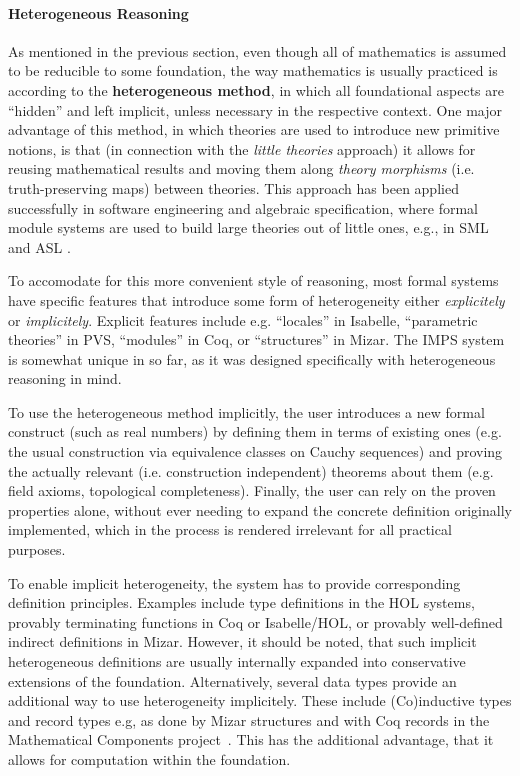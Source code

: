 \paragraph*{Heterogeneous Reasoning} As mentioned in the previous section, even though all of ma\-the\-ma\-tics is assumed to be reducible to some foundation, the way mathematics is usually practiced is according to the \textbf{heterogeneous method}, in which all foundational aspects are ``hidden'' and left implicit, unless necessary in the respective context. One major advantage of this method, in which theories are used to introduce new primitive notions, is that (in connection with the \emph{little theories} approach) it allows for reusing mathematical results and moving them along \emph{theory morphisms} (i.e. truth-preserving maps) between theories. This approach has been applied successfully in software engineering and algebraic specification, where formal module systems are used to build large theories out of little ones, e.g., in SML \cite{sml} and ASL \cite{asl}.

To accomodate for this more convenient style of reasoning, most formal systems have specific features that introduce some form of heterogeneity either \emph{explicitely} or \emph{implicitely}. Explicit features include e.g. ``locales'' in Isabelle,
``parametric theories'' in PVS, ``modules'' in Coq, or ``structures'' in Mizar. The 
IMPS system \cite{imps} is somewhat unique in so far, as it was designed specifically with heterogeneous reasoning in mind.

To use the heterogeneous method implicitly, the user introduces a new formal construct (such as real numbers) by defining them in terms of existing ones (e.g. the usual construction via equivalence classes on Cauchy sequences) and proving the actually relevant (i.e. construction independent) theorems about them (e.g. field axioms, topological completeness). Finally, the user can rely on the proven properties alone, without ever needing to expand the concrete definition originally implemented, which in the process is rendered irrelevant for all practical purposes.

To enable implicit heterogeneity, the system has to provide corresponding definition principles. Exam\-ples include type definitions in the HOL systems, provably terminating functions in Coq or Isa\-belle/HOL, or provably
well-defined indirect definitions in Mizar.  However, it should be noted, that such implicit heterogeneous definitions are usually internally expanded into conservative extensions of the foundation.
Alternatively, several data types provide an additional way to use heterogeneity implicitely. These include (Co)inductive types and record types e.g, as done by Mizar structures and with Coq records in the Mathematical Components project~\cite{MathComponents:on}. This has the additional advantage, that it allows for computation within the foundation.

